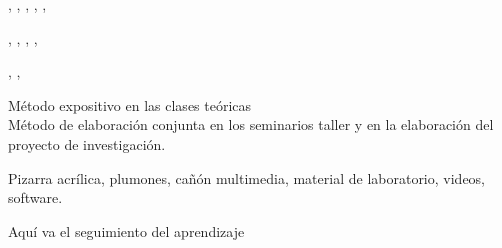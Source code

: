 \documentclass[a4paper,8pt]{article}
\begin{document}
\begin{contenidos}
\cite{Dix2004}, \cite{Stone2005}, \cite{Sharp2011}, \cite{Johnson2010}, \cite{Mathis2011}, \cite{Leavitt2006} 


\nextUnidad{\HCINewInteractiveTechnologies}
\nextCapitulo{\HCINewInteractiveTechnologies}
\nextTema{\HCINewInteractiveTechnologiesTopicChoosing}
\nextTema{\HCINewInteractiveTechnologiesTopicApproachesTo}
\nextTema{\HCIMixedAugmentedandVirtualRealityTopicOutput}
\nextTema{\HCIMixedAugmentedandVirtualRealityTopicSystem}

\cite{Dix2004}, \cite{Stone2005}, \cite{Sharp2011}, \cite{Wigdor2011}, \cite{Mathis2011} 


\nextUnidad{\HCICollaborationandcommunication}
\nextCapitulo{\HCICollaborationandcommunication}
\nextTema{\HCICollaborationandcommunicationTopicAsynchronous}
\nextTema{\HCICollaborationandcommunicationTopicSocial}
\nextTema{\HCICollaborationandcommunicationTopicOnline}
\nextTema{\HCICollaborationandcommunicationTopicOnlineCommunities}
\nextTema{\HCICollaborationandcommunicationTopicSoftware}
\nextTema{\HCICollaborationandcommunicationTopicSocialPsychology}

\cite{Dix2004}, \cite{Stone2005}, \cite{Sharp2011} 





\end{contenidos}




\begin{estrategiasEnsenanza}
    \begin{metodos}
        Método expositivo en las clases teóricas \\
        Método de elaboración conjunta en los seminarios taller y en la elaboración del proyecto de investigación.
    \end{metodos}
    \begin{medios}
        Pizarra acrílica, plumones, cañón multimedia, material de laboratorio, videos, software.
    \end{medios}
    \begin{formasOrganizacion}
    \end{formasOrganizacion}
    \begin{programacion}
    \end{programacion}
    \begin{segumientoAprendizaje}
        Aquí va el seguimiento del aprendizaje
    \end{segumientoAprendizaje}
\end{estrategiasEnsenanza}
\end{document}

